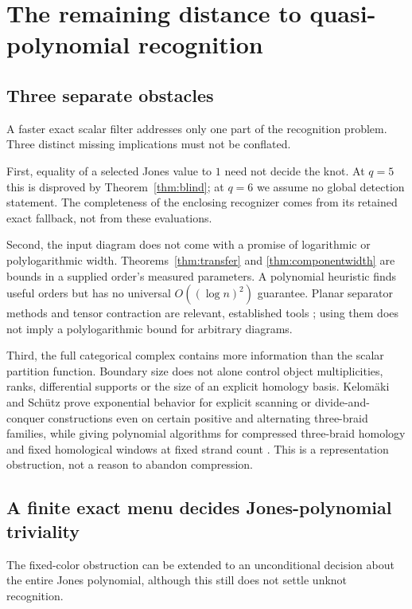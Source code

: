\section{The remaining distance to quasi-polynomial recognition}
\label{sec:complexity}

\subsection{Three separate obstacles}

A faster exact scalar filter addresses only one part of the recognition
problem. Three distinct missing implications must not be conflated.

First, equality of a selected Jones value to $1$ need not decide the knot.
At $q=5$ this is disproved by Theorem~\ref{thm:blind}; at $q=6$ we assume
no global detection statement. The completeness of the enclosing recognizer
comes from its retained exact fallback, not from these evaluations.

Second, the input diagram does not come with a promise of logarithmic or
polylogarithmic width. Theorems~\ref{thm:transfer} and
\ref{thm:componentwidth} are bounds in a supplied order's measured
parameters. A polynomial heuristic finds useful orders but has no universal
$O((\log n)^2)$ guarantee. Planar separator methods and tensor contraction
are relevant, established tools \cite{maria2021,seymour1994}; using them does
not imply a polylogarithmic bound for arbitrary diagrams.

Third, the full categorical complex contains more information than the
scalar partition function. Boundary size does not alone control object
multiplicities, ranks, differential supports or the size of an explicit
homology basis. Kelomäki and Schütz prove exponential behavior for explicit
scanning or divide-and-conquer constructions even on certain positive and
alternating three-braid families, while giving polynomial algorithms for
compressed three-braid homology and fixed homological windows at fixed strand
count \cite{kelomaki2026}. This is a representation obstruction, not a reason
to abandon compression.

\subsection{A finite exact menu decides Jones-polynomial triviality}

The fixed-color obstruction can be extended to an unconditional decision
about the entire Jones polynomial, although this still does not settle
unknot recognition.

